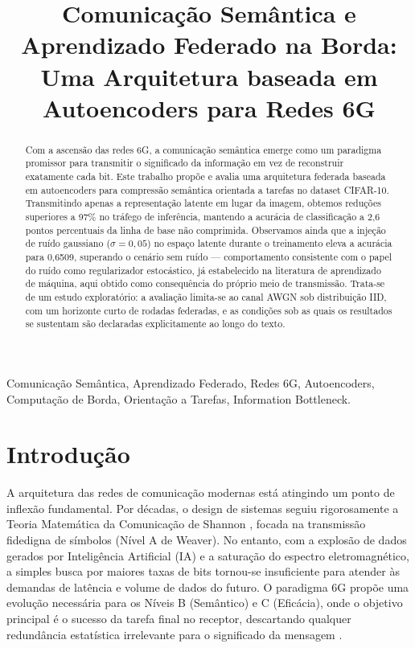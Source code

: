 \documentclass[conference,twocolumn]{IEEEtran}
\title{Comunicação Semântica e Aprendizado Federado na Borda: Uma Arquitetura baseada em Autoencoders para Redes 6G}
\author{
\IEEEauthorblockN{Gian Pedro Rodrigues\IEEEauthorrefmark{1},
Herman L. dos Santos\IEEEauthorrefmark{1}}
\IEEEauthorblockA{
\IEEEauthorrefmark{1}\textit{\small Departamento Acadêmico de Engenharia Elétrica,
Universidade Tecnológica Federal do Paraná}, Cornélio Procópio, Brasil\\
\small gian.2000@alunos.utfpr.edu.br,\ hermansantos@utfpr.edu.br}
}
\begin{document}
\maketitle

\begin{abstract}
Com a ascensão das redes 6G, a comunicação semântica emerge como um paradigma promissor para transmitir o significado da informação em vez de reconstruir exatamente cada bit. Este trabalho propõe e avalia uma arquitetura federada baseada em autoencoders para compressão semântica orientada a tarefas no dataset CIFAR-10. Transmitindo apenas a representação latente em lugar da imagem, obtemos reduções superiores a 97\% no tráfego de inferência, mantendo a acurácia de classificação a 2,6 pontos percentuais da linha de base não comprimida. Observamos ainda que a injeção de ruído gaussiano ($\sigma=0,05$) no espaço latente durante o treinamento eleva a acurácia para 0,6509, superando o cenário sem ruído --- comportamento consistente com o papel do ruído como regularizador estocástico, já estabelecido na literatura de aprendizado de máquina, aqui obtido como consequência do próprio meio de transmissão. Trata-se de um estudo exploratório: a avaliação limita-se ao canal AWGN sob distribuição IID, com um horizonte curto de rodadas federadas, e as condições sob as quais os resultados se sustentam são declaradas explicitamente ao longo do texto.
\end{abstract}

\begin{IEEEkeywords}
Comunicação Semântica, Aprendizado Federado, Redes 6G, Autoencoders, Computação de Borda, Orientação a Tarefas, Information Bottleneck.
\end{IEEEkeywords}

\section{Introdução}

A arquitetura das redes de comunicação modernas está atingindo um ponto de inflexão fundamental. Por décadas, o design de sistemas seguiu rigorosamente a Teoria Matemática da Comunicação de Shannon \cite{shannon1948}, focada na transmissão fidedigna de símbolos (Nível A de Weaver). No entanto, com a explosão de dados gerados por Inteligência Artificial (IA) e a saturação do espectro eletromagnético, a simples busca por maiores taxas de bits tornou-se insuficiente para atender às demandas de latência e volume de dados do futuro. O paradigma 6G propõe uma evolução necessária para os Níveis B (Semântico) e C (Eficácia), onde o objetivo principal é o sucesso da tarefa final no receptor, descartando qualquer redundância estatística irrelevante para o significado da mensagem \cite{yang2022semantic}.
\end{document}
